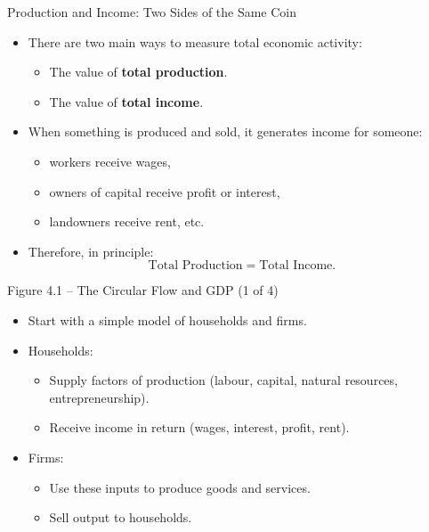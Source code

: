 \documentclass[aspectratio=169]{beamer}
\begin{document}
\begin{frame}{Production and Income: Two Sides of the Same Coin}
\transfade
\begin{itemize}[<+->]
  \item There are two main ways to measure total economic activity:
  \begin{itemize}[<+->]
    \item The value of \textbf{total production}.
    \item The value of \textbf{total income}.
  \end{itemize}
  \item When something is produced and sold, it generates \alert{income} for someone:
  \begin{itemize}[<+->]
    \item workers receive wages,
    \item owners of capital receive profit or interest,
    \item landowners receive rent, etc.
  \end{itemize}
  \item Therefore, in principle:  
  \[
    \text{Total Production} = \text{Total Income}.
  \]
\end{itemize}
\end{frame}


\begin{frame}{Figure 4.1 -- The Circular Flow and GDP (1 of 4)}
\transfade
\begin{itemize}[<+->]
  \item Start with a simple model of households and firms.
  \item Households:
  \begin{itemize}[<+->]
    \item Supply factors of production (labour, capital, natural resources, entrepreneurship).
    \item Receive income in return (wages, interest, profit, rent).
  \end{itemize}
  \item Firms:
  \begin{itemize}[<+->]
    \item Use these inputs to produce goods and services.
    \item Sell output to households.
  \end{itemize}
\end{itemize}
\end{frame}
\end{document}
